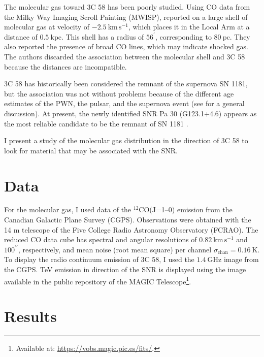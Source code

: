 \documentclass[baaa]{baaa}
\begin{document}
The molecular gas toward 3C 58 has been poorly studied. Using CO data from the Milky Way Imaging Scroll Painting (MWISP), \cite{zhou23} reported on a large shell of molecular gas at velocity of $-2.5~\mathrm{km\,s^{-1}}$, which places it in the Local Arm at a distance of $0.5~\mathrm{kpc}$. This shell has a radius of $56^{\prime}$, corresponding to $80~\mathrm{pc}$. They also reported the presence of broad CO lines, which may indicate shocked gas. The authors discarded the association between the molecular shell and 3C 58 because the distances are incompatible. 

3C 58 has historically been considered the remnant of the supernova SN 1181, but the association was not without problems because of the different age estimates of the PWN, the pulsar, and the supernova event (see \citealt{kothes17} for a general discussion). At present, the newly identified SNR Pa 30 (G123.1$+$4.6) appears as the most reliable candidate to be the remnant of SN 1181 \citep{fesen23}.

I present a study of the molecular gas distribution in the direction of 3C 58 to look for material that may be associated  with the SNR.

\section{Data}
\label{S_data}

For the molecular gas, I used data of the $^{12}$CO(J=1--0) emission from the Canadian Galactic Plane Survey (CGPS).
Observations were obtained with the 14 m telescope of the Five College Radio Astronomy Observatory (FCRAO). The reduced CO data cube has spectral and angular resolutions of $0.82~\mathrm{km\,s^{-1}}$ and $100^{\prime\prime}$, respectively, and mean noise (root mean square) per channel $\sigma_{\mathrm{chan}} = 0.16~\mathrm{K}$.   
To display the radio continuum emission of 3C 58, I  used the $1.4~\mathrm{GHz}$ image from the CGPS. TeV emission in direction of the SNR is displayed using the image available in the public repository of the MAGIC Telescope\footnote{Available at: \url{https://vobs.magic.pic.es/fits/}.}. 

\section{Results}
\label{S_results}
\end{document}

